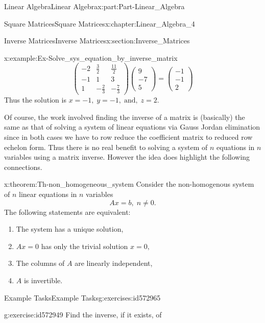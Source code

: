 \documentclass[oneside,10pt,]{book}
\numberwithin{equation}{section}
\newcommand{\amp}{&}
\begin{document}
\begin{partptx}{Linear Algebra}{}{Linear Algebra}{}{}{x:part:Part-Linear_Algebra}
\begin{chapterptx}{Square Matrices}{}{Square Matrices}{}{}{x:chapter:Linear_Algebra_4}
\begin{sectionptx}{Inverse Matrices}{}{Inverse Matrices}{}{}{x:section:Inverse_Matrices}
\begin{example}{}{x:example:Ex-Solve_sys_equation_by_inverse_matrix}
\begin{equation*}
\begin{pmatrix}
-2 \amp \frac{3}{2} \amp \frac{11}{2}  \\
-1 \amp 1 \amp 3 \\
1 \amp -\frac{2}{3} \amp  -\frac{7}{3} 
\end{pmatrix}
\begin{pmatrix}
9 \\
-7 \\
5
\end{pmatrix}=
\begin{pmatrix}
-1 \\
-1 \\
2
\end{pmatrix}
\end{equation*}
Thus the solution is  \(x=-1, \; y=-1,\; \text{and}, \; z=2. \)\end{example}
 Of course, the work involved finding the inverse of a matrix is (basically) the same as that of solving a system of linear equations via Gauss Jordan elimination since in both cases we have to row reduce the coefficient matrix to reduced row echelon form. Thus there is no real benefit to solving a system of \(n \) equations in \(n \) variables using a matrix inverse. However the idea does highlight the following connections. \begin{theorem}{}{}{x:theorem:Th-non_homogeneous_system}%
Consider the non-homogenous system of \(n \) linear equations in \(n \) variables%
\begin{equation*}
Ax=b,\; n\neq 0.
\end{equation*}
The following statements are equivalent: %
\begin{enumerate}
\item{}The system has a unique solution,%
\item{}\(Ax=0 \)  has only the trivial solution  \(x=0, \)%
\item{}The columns of \(A \)  are linearly independent,%
\item{}\(A \) is invertible.%
\end{enumerate}
%
\end{theorem}
%
%
\typeout{************************************************}
\typeout{************************************************}
%
\begin{exercises-subsection-numberless}{Example Tasks}{}{Example Tasks}{}{}{g:exercises:id572965}
\begin{divisionexercise}{1}{}{}{g:exercise:id572949}%
Find the inverse, if it exists, of%
\begin{align*}

\end{align*}
\end{divisionexercise}
\end{exercises-subsection-numberless}
\end{sectionptx}
\end{chapterptx}
\end{partptx}
\end{document}
